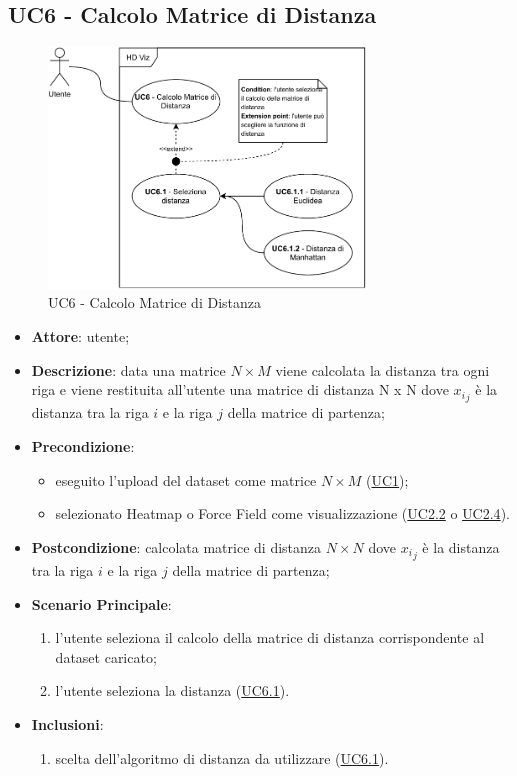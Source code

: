 \subsection{UC6 - Calcolo Matrice di Distanza}
\label{uc6}

    \begin{figure}[htbp]
        \centering
        \includegraphics[width=0.75\textwidth]{source/sections/casi-uso/diagrams/uc6.pdf}
        \caption{UC6 - Calcolo Matrice di Distanza}
        \label{fig:uc6}
    \end{figure}
    
    \begin{itemize}
    \item \textbf{Attore}: utente;
    \item \textbf{Descrizione}: data una matrice $N \times M$ viene calcolata la distanza tra ogni riga e viene restituita all'utente una matrice di distanza N x N dove ${x_i}_j$ è la distanza tra la riga $i$ e la riga $j$ della matrice di partenza;
    \item \textbf{Precondizione}: 
    \begin{itemize}
        \item eseguito l'upload del dataset come matrice $N\times M$ (\hyperref[uc1]{UC1});
        \item selezionato Heatmap o Force Field come visualizzazione (\hyperref[uc2.2]{UC2.2} o \hyperref[uc2.4]{UC2.4}).
    \end{itemize}  
    \item \textbf{Postcondizione}: calcolata matrice di distanza $N \times N$ dove ${x_i}_j$ è la distanza tra la riga $i$ e la riga $j$ della matrice di partenza;
    \item \textbf{Scenario Principale}: 
    \begin{enumerate}
        \item l'utente seleziona il calcolo della matrice di distanza corrispondente al dataset caricato;
        \item l'utente seleziona la distanza (\hyperref[uc6.1]{UC6.1}).
    \end{enumerate}  
    \item \textbf{Inclusioni}:
        \begin{enumerate}
            \item scelta dell'algoritmo di distanza da utilizzare (\hyperref[uc6.1]{UC6.1}).
        \end{enumerate} 
    \end{itemize}
    

